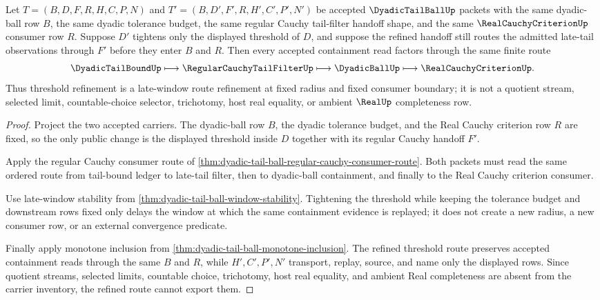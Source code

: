 \begin{theorem}
\label{thm:dyadic-tail-ball-threshold-refinement-route}
Let $T=(B,D,F,R,H,C,P,N)$ and $T'=(B,D',F',R,H',C',P',N')$ be accepted $\DyadicTailBallUp$ packets with the same dyadic-ball row $B$, the same dyadic tolerance budget, the same regular Cauchy tail-filter handoff shape, and the same $\RealCauchyCriterionUp$ consumer row $R$. Suppose $D'$ tightens only the displayed threshold of $D$, and suppose the refined handoff still routes the admitted late-tail observations through $F'$ before they enter $B$ and $R$. Then every accepted containment read factors through the same finite route
$$
\DyadicTailBoundUp \longmapsto \RegularCauchyTailFilterUp \longmapsto \DyadicBallUp \longmapsto \RealCauchyCriterionUp .
$$
Thus threshold refinement is a late-window route refinement at fixed radius and fixed consumer boundary; it is not a quotient stream, selected limit, countable-choice selector, trichotomy, host real equality, or ambient $\RealUp$ completeness row.
\end{theorem}
\begin{proof}
Project the two accepted carriers. The dyadic-ball row $B$, the dyadic tolerance budget, and the Real Cauchy criterion row $R$ are fixed, so the only public change is the displayed threshold inside $D$ together with its regular Cauchy handoff $F'$.

Apply the regular Cauchy consumer route of \autoref{thm:dyadic-tail-ball-regular-cauchy-consumer-route}. Both packets must read the same ordered route from tail-bound ledger to late-tail filter, then to dyadic-ball containment, and finally to the Real Cauchy criterion consumer.

Use late-window stability from \autoref{thm:dyadic-tail-ball-window-stability}. Tightening the threshold while keeping the tolerance budget and downstream rows fixed only delays the window at which the same containment evidence is replayed; it does not create a new radius, a new consumer row, or an external convergence predicate.

Finally apply monotone inclusion from \autoref{thm:dyadic-tail-ball-monotone-inclusion}. The refined threshold route preserves accepted containment reads through the same $B$ and $R$, while $H',C',P',N'$ transport, replay, source, and name only the displayed rows. Since quotient streams, selected limits, countable choice, trichotomy, host real equality, and ambient Real completeness are absent from the carrier inventory, the refined route cannot export them.
\end{proof}

